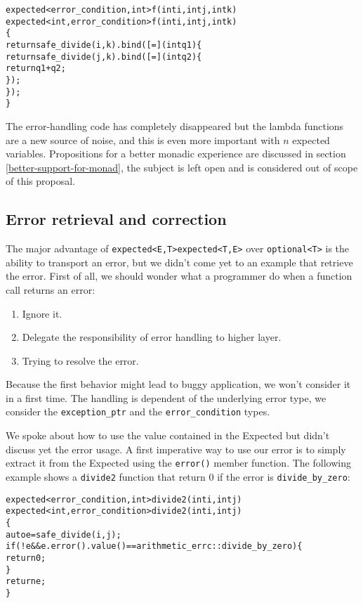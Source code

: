 \documentclass[a4paper,10pt]{article}
\newcommand{\cpp}[1]{\lstinline{#1}}
\newcommand{\suppress}[1]{\colorbox{suppress_color}{#1}}
\newcommand{\update}[1]{\colorbox{update_color}{#1}}
\begin{document}
\begin{alltt}
\suppress{expected<error_condition, int> f(int i, int j, int k)}
\update{expected<int, error_condition> f(int i, int j, int k)}
\{
  return safe_divide(i, k).bind([=](int q1) \{
      return safe_divide(j,k).bind([=](int q2) \{
        return q1+q2;
      \});
    \});
\}
\end{alltt}

The error-handling code has completely disappeared but the lambda functions are a new source of noise, and this is even more important with $n$ expected variables. Propositions for a better monadic experience are discussed in section \ref{better-support-for-monad}, the subject is left open and is considered out of scope of this proposal.

\subsection{Error retrieval and correction}

The major advantage of \suppress{\cpp{expected<E,T>}}\update{\cpp{expected<T,E>}} over \cpp{optional<T>} is the ability to transport an error, but we didn't come yet to an example that retrieve the error. First of all, we should wonder what a programmer do when a function call returns an error:

\begin{enumerate}
 \item Ignore it.
 \item Delegate the responsibility of error handling to higher layer.
 \item Trying to resolve the error.
\end{enumerate}

Because the first behavior might lead to buggy application, we won't consider it in a first time. The handling is dependent of the underlying error type, we consider the \cpp{exception_ptr} and the \cpp{error_condition} types.

We spoke about how to use the value contained in the Expected but didn't discuss yet the error usage. A first imperative way to use our error is to simply extract it from the Expected using the \cpp{error()} member function. The following example shows a \cpp{divide2} function that return 0 if the error is \cpp{divide_by_zero}:

\begin{alltt}
\suppress{expected<error_condition, int> divide2(int i, int j)}
\update{expected<int, error_condition> divide2(int i, int j)}
\{
  auto e = safe_divide(i,j);
  if (!e && e.error().value() == arithmetic_errc::divide_by_zero) \{
    return 0;
  \}
  return e;
\}
\end{alltt}
\end{document}
